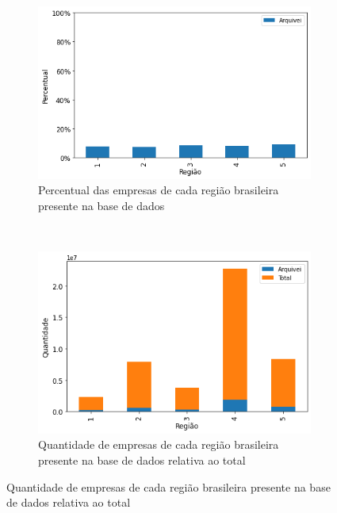 \begin{figure}[htb]
    \centering
    \caption{Participação por região das empresas presentes na base de dados}
    \label{fig:base-de-dados:descritiva-1-presenca-por-regiao} 
    \begin{subfigure}[b]{0.45\textwidth} 
        \includegraphics[scale=0.45]{images/base-de-dados-1.1-presenca-por-regiao.png}
        \caption{Percentual das empresas de cada região brasileira presente na base de dados}
        \label{fig:base-de-dados:descritiva-1.1-presenca-por-regiao-1.1}
    \end{subfigure} ~ \quad
    \begin{subfigure}[b]{0.45\textwidth}
        \includegraphics[scale=0.45]{images/base-de-dados-1.2-qtde-por-regiao.png}
        \caption{Quantidade de empresas de cada região brasileira presente na base de dados relativa ao total}
        \label{fig:base-de-dados:descritiva-1.2-qtde-por-regiao}
    \end{subfigure}
    \fdadospesquisa
\end{figure}

